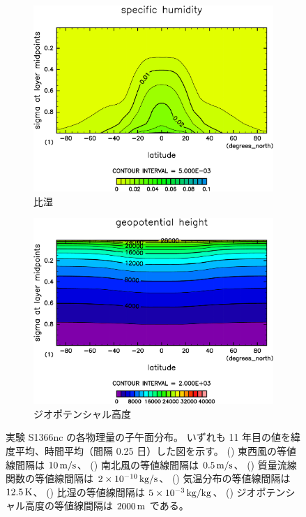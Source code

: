 \documentclass[body]{subfiles}
\begin{document}
\begin{figure}[t]
\begin{subfigure}{.4\textwidth}
		\includegraphics[width=\textwidth]{S1366-nc/QH2OVap,time=3650:4015-crop-rotate.pdf}
		\caption{比湿\hmu*{[kg/kg]}}\label{S1366nc比湿}
	\end{subfigure}
	\begin{subfigure}{.4\textwidth}
		\centering
		\includegraphics[width=\textwidth]{S1366-nc/Height,time=3650:4015-crop-rotate.pdf}
		\caption{ジオポテンシャル高度\hmu*{[m/s]}}\label{S1366ncジオポテンシャル高度}
	\end{subfigure}
	\caption[実験 S1366nc の各物理量の子午面分布]{
		実験 S1366nc の各物理量の子午面分布。
		いずれも 11 年目の値を緯度平均、時間平均（間隔 0.25 日）した図を示す。
		() 東西風の等値線間隔は \(10\hmu{m/s}\)、
		() 南北風の等値線間隔は \(0.5\hmu{m/s}\)、
		() 質量流線関数の等値線間隔は \(2\hme{-10}\hmu{kg/s}\)、
		() 気温分布の等値線間隔は \(12.5\hmu{K}\)、
		() 比湿の等値線間隔は \(5\hme{-3}\hmu{kg/kg}\)、
		() ジオポテンシャル高度の等値線間隔は \(2000\hmu{m}\) である。
	}\label{S1366nc}
\end{figure}
\end{document}
